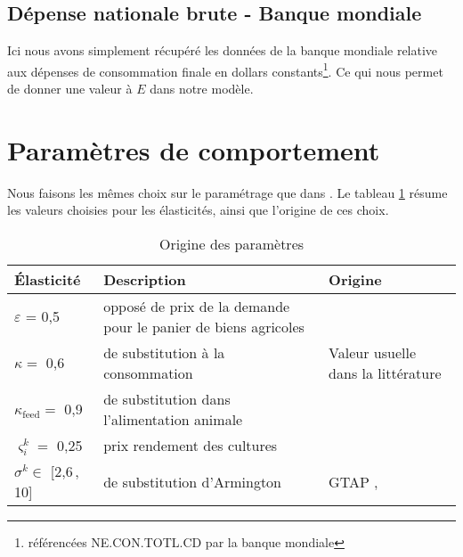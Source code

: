 \subsection{Dépense nationale brute - Banque mondiale}

Ici nous avons simplement récupéré les données de la banque mondiale relative aux dépenses de consommation finale en dollars constants\footnote{référencées NE.CON.TOTL.CD par la banque mondiale}. Ce qui nous permet de donner une valeur à $E$ dans notre modèle.


\section{Paramètres de comportement}
Nous faisons les mêmes choix sur le paramétrage que dans \cite{Gouel2025}. Le tableau \ref{tab:ela} résume les valeurs choisies pour les élasticités, ainsi que l'origine de ces choix.

\begin{table}[hbt!]
    \centering
    \begin{tabularx}{\textwidth}{l >{\raggedright\arraybackslash}X >{\raggedright\arraybackslash}X}
        \textbf{Élasticité}        & \textbf{Description}                                           & \textbf{Origine}                                   \\ \hline
        $\varepsilon$ = 0,5        & opposé de prix de la demande pour le panier de biens agricoles & \cite{Comin2021}                                   \\
        $\kappa =$ 0,6             & de substitution à la consommation                              & Valeur usuelle dans la littérature \cite{Rude2000} \\
        $\kappa_\text{feed} =$ 0,9 & de substitution dans l'alimentation animale                    & \cite{Rude2000}                                    \\
        $\varsigma_i^k =$ 0,25     & prix rendement des cultures                                    & \cite{Keeney2009}                                  \\
        $\sigma^k \in$ [2,6\,, 10] & de substitution d'Armington                                    & GTAP  \cite{Aguiar2022}, \cite{Costinot2016}       \\
        \hline
    \end{tabularx}
    \caption{Origine des paramètres}
    \label{tab:ela}
\end{table}

